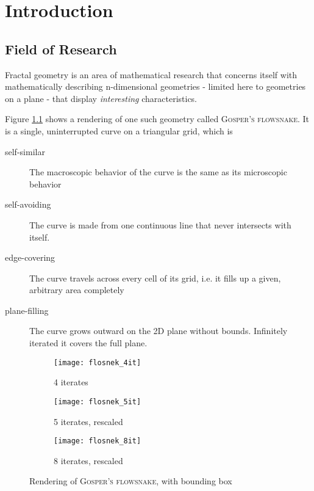 \chapter{Introduction}
\label{cha:Intro}

\section{Field of Research}

Fractal geometry is an area of mathematical research that concerns itself with mathematically describing n-dimensional geometries - limited here to geometries on a plane - that display \textit{interesting} characteristics. 

Figure \ref{fig:flosnek} shows a rendering of one such geometry called \textsc{Gosper's flowsnake}.
It is a single, uninterrupted curve on a triangular grid, which is

\begin{description}
	\item [self-similar] The macroscopic behavior of the curve is the same as its microscopic behavior
	\item [self-avoiding] The curve is made from one continuous line that never intersects with itself.
	\item [edge-covering] The curve travels across every cell of its grid, i.e. it fills up a given, arbitrary area completely
	\item [plane-filling] The curve grows outward on the 2D plane without bounds. Infinitely iterated it covers the full plane.
\end{description}

\begin{figure}[h]
\centering
\begin{subfigure}{.33\textwidth}
  \centering
  \texttt{[image: flosnek\_4it]}
  \caption{4 iterates}
\end{subfigure}%
\begin{subfigure}{.33\textwidth}
  \centering
  \texttt{[image: flosnek\_5it]}
  \caption{5 iterates, rescaled}
\end{subfigure}%
\begin{subfigure}{.33\textwidth}
  \centering
  \texttt{[image: flosnek\_8it]}
  \caption{8 iterates, rescaled}
\end{subfigure}
\caption{Rendering of \textsc{Gosper's flowsnake}, with \gls{bounding box}}
	\label{fig:flosnek}
\end{figure}

